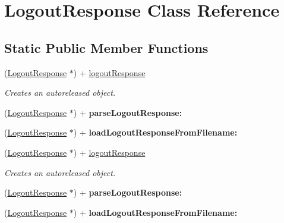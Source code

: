 \hypertarget{interface_logout_response}{
\section{LogoutResponse Class Reference}
\label{interface_logout_response}
}
\subsection*{Static Public Member Functions}
\begin{DoxyCompactItemize}
\item 
(\hyperlink{interface_logout_response}{LogoutResponse} $\ast$) + \hyperlink{interface_logout_response_a9cfa077fb292c9581ba1a6ab8196a39d}{logoutResponse}
\begin{DoxyCompactList}\small\item\em Creates an autoreleased object. \item\end{DoxyCompactList}\item 
\hypertarget{interface_logout_response_a7d196557053f785ec2b739a18214c7e7}{
(\hyperlink{interface_logout_response}{LogoutResponse} $\ast$) + {\bfseries parseLogoutResponse:}}
\label{interface_logout_response_a7d196557053f785ec2b739a18214c7e7}

\item 
\hypertarget{interface_logout_response_a2356e21b1ef730a1a8c3c7098e39521f}{
(\hyperlink{interface_logout_response}{LogoutResponse} $\ast$) + {\bfseries loadLogoutResponseFromFilename:}}
\label{interface_logout_response_a2356e21b1ef730a1a8c3c7098e39521f}

\item 
(\hyperlink{interface_logout_response}{LogoutResponse} $\ast$) + \hyperlink{interface_logout_response_a9cfa077fb292c9581ba1a6ab8196a39d}{logoutResponse}
\begin{DoxyCompactList}\small\item\em Creates an autoreleased object. \item\end{DoxyCompactList}\item 
\hypertarget{interface_logout_response_a7d196557053f785ec2b739a18214c7e7}{
(\hyperlink{interface_logout_response}{LogoutResponse} $\ast$) + {\bfseries parseLogoutResponse:}}
\label{interface_logout_response_a7d196557053f785ec2b739a18214c7e7}

\item 
\hypertarget{interface_logout_response_a2356e21b1ef730a1a8c3c7098e39521f}{
(\hyperlink{interface_logout_response}{LogoutResponse} $\ast$) + {\bfseries loadLogoutResponseFromFilename:}}
\label{interface_logout_response_a2356e21b1ef730a1a8c3c7098e39521f}


\end{DoxyCompactItemize}
